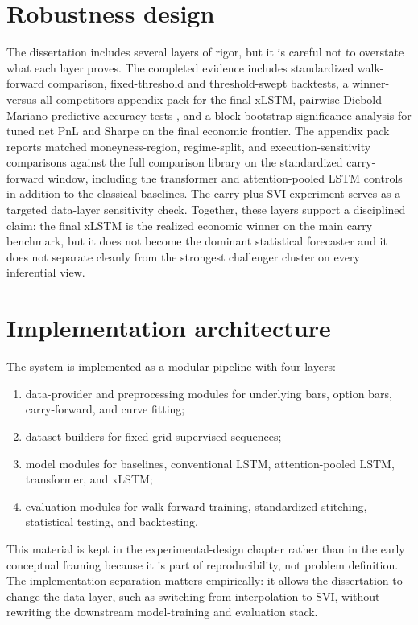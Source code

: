 \documentclass[12pt]{report}
\begin{document}
\section{Robustness design}
The dissertation includes several layers of rigor, but it is careful not to overstate what each layer proves. The completed evidence includes standardized walk-forward comparison, fixed-threshold and threshold-swept backtests, a winner-versus-all-competitors appendix pack for the final xLSTM, pairwise Diebold--Mariano predictive-accuracy tests \citep{diebold1995}, and a block-bootstrap significance analysis for tuned net PnL and Sharpe on the final economic frontier. The appendix pack reports matched moneyness-region, regime-split, and execution-sensitivity comparisons against the full comparison library on the standardized carry-forward window, including the transformer and attention-pooled LSTM controls in addition to the classical baselines. The carry-plus-SVI experiment serves as a targeted data-layer sensitivity check. Together, these layers support a disciplined claim: the final xLSTM is the realized economic winner on the main carry benchmark, but it does not become the dominant statistical forecaster and it does not separate cleanly from the strongest challenger cluster on every inferential view.

\section{Implementation architecture}
The system is implemented as a modular pipeline with four layers:
\begin{enumerate}[leftmargin=1.2cm]
    \item data-provider and preprocessing modules for underlying bars, option bars, carry-forward, and curve fitting;
    \item dataset builders for fixed-grid supervised sequences;
    \item model modules for baselines, conventional LSTM, attention-pooled LSTM, transformer, and xLSTM;
    \item evaluation modules for walk-forward training, standardized stitching, statistical testing, and backtesting.
\end{enumerate}

This material is kept in the experimental-design chapter rather than in the early conceptual framing because it is part of reproducibility, not problem definition. The implementation separation matters empirically: it allows the dissertation to change the data layer, such as switching from interpolation to SVI, without rewriting the downstream model-training and evaluation stack.
\end{document}
